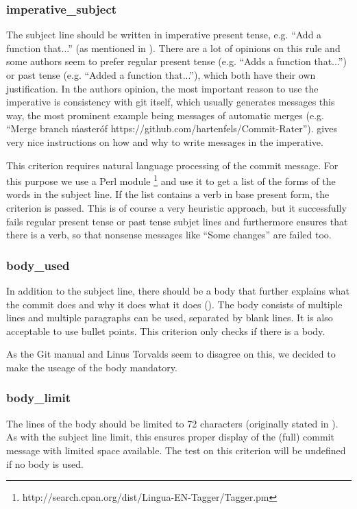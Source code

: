 \subsubsection{imperative\_subject}
\label{subs:imperative_subject}
The subject line should be written in imperative present tense, e.g. ``Add a function that...'' (as mentioned in \cite{OffGuide}). There are a lot of opinions on this rule and some authors seem to prefer regular present tense (e.g. ``Adds a function that...'') or past tense (e.g. ``Added a function that...''), which both have their own justification. In the authors opinion, the most important reason to use the imperative is consistency with git itself, which usually generates messages this way, the most prominent example being messages of automatic merges (e.g. ``Merge branch \'master\' of https://github.com/hartenfels/Commit-Rater''). \cite{CB} gives very nice instructions on how and why to write messages in the imperative.

This criterion requires natural language processing of the commit
message. For this purpose we use a Perl module \footnote{http://search.cpan.org/dist/Lingua-EN-Tagger/Tagger.pm} and use it to get a list of the forms of the words in the subject line. If the list contains a verb in base present form, the criterion is passed. This is of course a very heuristic approach, but it successfully fails regular present tense or past tense subjet lines and furthermore ensures that there is a verb, so that nonsense messages like ``Some changes'' are failed too.

\subsubsection{body\_used}
\label{subs:body_used}
In addition to the subject line, there should be a body that further explains what the commit does and why it does what it does (\cite{OffGuide}). The body consists of multiple lines and multiple paragraphs can be used, separated by blank lines. It is also acceptable to use bullet points. This criterion only checks if there is a body.

As the Git manual \cite{OffGuide} and Linus Torvalds \cite{SR} seem to disagree on this, we decided to make the useage of the body mandatory.

\subsubsection{body\_limit}
\label{subs:body_limit}
The lines of the body should be limited to 72 characters (originally stated in \cite{TP}). As with the subject line limit, this ensures proper display of the (full) commit message with limited space available. The test on this criterion will be undefined if no body is used.

